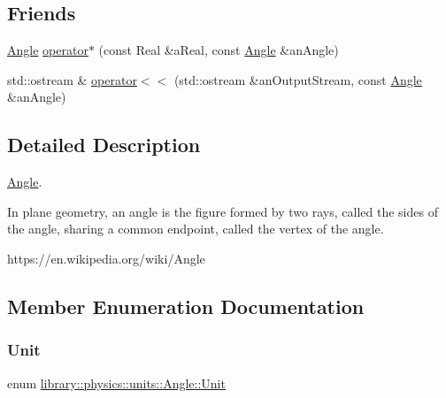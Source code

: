 \subsection*{Friends}
\begin{DoxyCompactItemize}
\item 
\hyperlink{classlibrary_1_1physics_1_1units_1_1_angle}{Angle} \hyperlink{classlibrary_1_1physics_1_1units_1_1_angle_af699984b24759466957ecddaa7e61fc9}{operator$\ast$} (const Real \&a\+Real, const \hyperlink{classlibrary_1_1physics_1_1units_1_1_angle}{Angle} \&an\+Angle)
\item 
std\+::ostream \& \hyperlink{classlibrary_1_1physics_1_1units_1_1_angle_a0846b77ee3281e8a559197c3c3208eed}{operator$<$$<$} (std\+::ostream \&an\+Output\+Stream, const \hyperlink{classlibrary_1_1physics_1_1units_1_1_angle}{Angle} \&an\+Angle)
\end{DoxyCompactItemize}


\subsection{Detailed Description}
\hyperlink{classlibrary_1_1physics_1_1units_1_1_angle}{Angle}. 

In plane geometry, an angle is the figure formed by two rays, called the sides of the angle, sharing a common endpoint, called the vertex of the angle.

https\+://en.wikipedia.\+org/wiki/\+Angle 

\subsection{Member Enumeration Documentation}
\mbox{\label{classlibrary_1_1physics_1_1units_1_1_angle_a3c329d415a61783b16ce481874cc5956}} 
\subsubsection{\texorpdfstring{Unit}{Unit}}
{\footnotesize\ttfamily enum \hyperlink{classlibrary_1_1physics_1_1units_1_1_angle_a3c329d415a61783b16ce481874cc5956}{library\+::physics\+::units\+::\+Angle\+::\+Unit}\hspace{0.3cm}{\ttfamily [strong]}}

